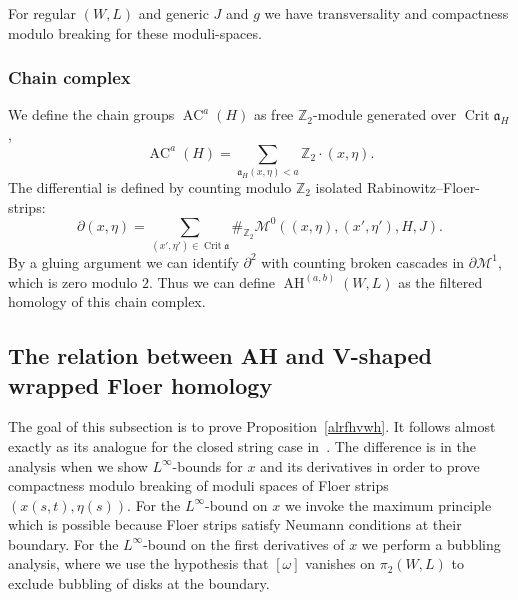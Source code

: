 \documentclass{amsart}
\newcommand{\Mcal}{{\mathcal{M}}}
\newcommand{\Scal}{{\mathcal{S}}}
\newcommand{\acal}{\mathfrak{a}}
\newcommand{\ZZ}{\mathbb{Z}}
\newcommand{\AH}{\operatorname{AH}}
\newcommand{\AC}{\operatorname{AC}}
\newcommand{\WcheckH}{\operatorname{\check wH}}
\newcommand{\Crit}{\operatorname{Crit}}
\newtheorem{theorem}{Theorem}
\theoremstyle{definition}
\theoremstyle{remark}
\numberwithin{equation}{section}
\begin{document}
For regular $(W,L)$ and generic $J$ and $g$ we have transversality and compactness modulo breaking for these moduli-spaces. 

\subsubsection*{Chain complex}
We define the chain groups $\AC^a(H)$ as free $\ZZ_2$-module generated over $\Crit\acal_H$,
\begin{equation*}
	\AC^a(H)=\sum_{\acal_H(x,\eta)<a}\ZZ_2\cdot(x,\eta).
\end{equation*}
The differential is defined by counting modulo $\ZZ_2$ isolated Rabinowitz--Floer-strips:
\begin{equation*}
	\partial(x,\eta)=\sum_{(x',\eta')\in\Crit\acal}\#_{\ZZ_2}\Mcal^0((x,\eta),(x',\eta'),H,J).
\end{equation*}
By a gluing argument we can identify $\partial^2$ with counting broken cascades in $\partial\Mcal^1$, which is zero modulo $2$. Thus we can define $\AH^{(a,b)}(W,L)$ as the filtered homology of this chain complex. 

\subsection{The relation between AH and V-shaped wrapped Floer homology}\label{sec:sequence}
The goal of this subsection is to prove Proposition~\ref{alrfhvwh}. It follows almost exactly as its analogue for the closed string case in~\cite{CFO10}. The difference is in the analysis when we show $L^\infty$-bounds for $x$ and its derivatives in order to prove compactness modulo breaking of moduli spaces of Floer strips $(x(s,t),\eta(s))$. For the $L^\infty$-bound on $x$ we invoke the maximum principle which is possible because Floer strips satisfy Neumann conditions at their boundary. For the $L^\infty$-bound on the first derivatives of $x$ we perform a bubbling analysis, where we use the hypothesis that $[\omega]$ vanishes on $\pi_2(W,L)$ to exclude bubbling of disks at the boundary. 
\end{document}
